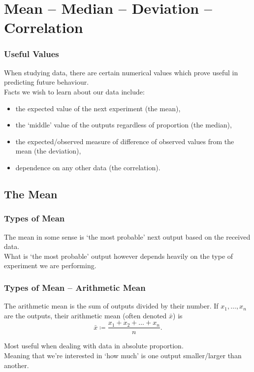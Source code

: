\documentclass[aspectratio=169,11pt,svgnames]{beamer}
\begin{document}
\section{Mean -- Median -- Deviation -- Correlation}

\begin{frame}
 \frametitle{Useful Values}
 When studying data, there are \alert{certain numerical values} which prove
 useful in predicting future behaviour.\\
 \pause
 Facts we wish to learn about our data include:
 \pause
 \begin{itemize}[label=\textbullet]
  \item the expected value of the next experiment (the \alert{mean}),
  \pause
  \item the `middle' value of the outputs regardless of proportion (the
   \alert{median}),
  \pause
  \item the expected/observed measure of difference of observed values from the
   mean (the \alert{deviation}),
  \pause
  \item dependence on any other data (the \alert{correlation}).
 \end{itemize}
\end{frame}

\subsection{The Mean}

\begin{frame}
 \subsectionpage
\end{frame}

\begin{frame}
 \frametitle{Types of Mean}
 The \alert{mean} in some sense is `the most probable' next output based on the
 received data.\\
 \pause
 What is `the most probable' output however depends heavily on the type of
 experiment we are performing.\\
\end{frame}

\begin{frame}
 \frametitle{Types of Mean -- Arithmetic Mean}
 \begin{tcolorbox}[title=Arithmetic Mean]
  The \alert{arithmetic mean} is the sum of outputs divided by their number. If
  $x_1,\ldots,x_n$ are the outputs, their arithmetic mean (often denoted
  $\bar{x}$) is
  \[
   \bar{x} \coloneqq \frac{x_1+x_2+\ldots +x_n}{n}.
  \]
 \end{tcolorbox}
 \pause
 Most useful when dealing with data in \alert{absolute} proportion.\\
 \pause
 Meaning that we're interested in `\alert{how much}' is one output
 smaller/larger than another.
\end{frame}
\end{document}
